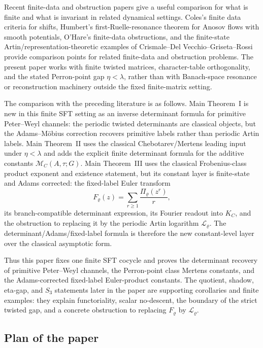 \documentclass[11pt,a4paper]{amsart}
\theoremstyle{plain}
\theoremstyle{definition}
\theoremstyle{remark}
\begin{document}
Recent finite-data and obstruction papers give a useful comparison for what is
finite and what is invariant in related dynamical settings.  Coles's finite
data criteria for shifts, Humbert's first-Ruelle-resonance theorem for Anosov
flows with smooth potentials, O'Hare's finite-data obstructions, and
the finite-state Artin/representation-theoretic examples of
Crismale--Del Vecchio--Griseta--Rossi
\cite{Coles2025VassilievWritheAxiomA,Humbert2025FirstRuelleResonance,OHare2025FiniteDataRigidity,CrismaleDelVecchioGrisetaRossi2025NoncommutativeSkewProduct}
provide comparison points for related finite-data and obstruction problems.
The present paper works with finite twisted matrices, character-table
orthogonality, and the stated Perron-point gap \(\eta<\lambda\), rather than
with Banach-space resonance or reconstruction machinery outside the fixed
finite-matrix setting.

The comparison with the preceding literature is as follows.  Main Theorem~I is new in
this finite SFT setting as an inverse determinant formula for primitive
Peter--Weyl channels: the periodic twisted determinants are classical objects,
but the Adams--M\"obius correction recovers primitive labels rather than
periodic Artin labels.  Main Theorem~II uses the classical Chebotarev/Mertens
leading input under \(\eta<\lambda\) and adds the explicit finite determinant
formula for the additive constants \(\mathcal M_C(A,\tau;G)\).  Main
Theorem~III uses the classical Frobenius-class product exponent and existence
statement, but its constant layer is finite-state and Adams corrected: the
fixed-label Euler transform
\[
  F_\varrho(z)=\sum_{r\ge1}\frac{\Pi_\varrho(z^r)}{r},
\]
its branch-compatible determinant expression, its Fourier readout into
\(K_C\), and the obstruction to replacing it by the periodic Artin logarithm
\(\mathcal L_\varrho\).  The determinant/Adams/fixed-label formula is therefore
the new constant-level layer over the classical asymptotic form.

Thus this paper fixes one finite SFT cocycle and proves the determinant
recovery of primitive Peter--Weyl channels, the Perron-point class Mertens
constants, and the Adams-corrected fixed-label Euler-product constants.  The
quotient, shadow, eta-gap, and \(S_3\) statements later in the paper are
supporting corollaries and finite examples: they explain functoriality, scalar
no-descent, the boundary of the strict twisted gap, and a concrete obstruction
to replacing \(F_\varrho\) by \(\mathcal L_\varrho\).
\subsection{Plan of the paper}
\end{document}
